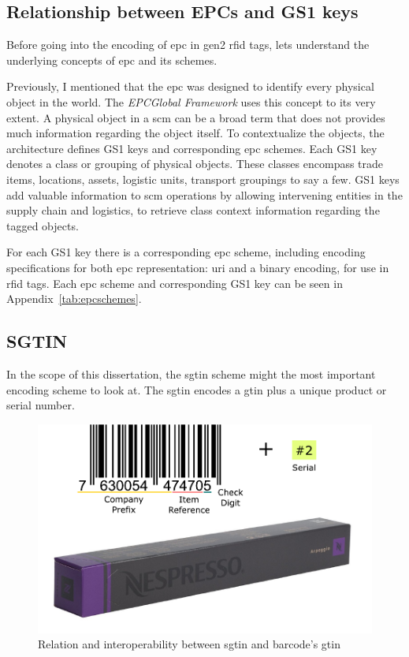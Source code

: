 \subsection{Relationship between EPCs and GS1 keys}

Before going into the encoding of \ac{epc} in \ac{gen2} \ac{rfid} tags, lets understand the underlying concepts of \ac{epc} and its schemes.

Previously, I mentioned that the \ac{epc} was designed to identify every physical object in the world.
The \emph{EPCGlobal Framework} uses this concept to its very extent.
A physical object in a \ac{scm} can be a broad term that does not provides much information regarding the object itself.
To contextualize the objects, the architecture defines GS1 keys and corresponding \ac{epc} schemes.
Each GS1 key denotes a class or grouping of physical objects. These classes encompass trade items, locations, assets, logistic units, transport groupings to say a few.
GS1 keys add valuable information to \ac{scm} operations by allowing intervening entities in the supply chain and logistics, to retrieve class context information regarding the tagged objects.

For each GS1 key there is a corresponding \ac{epc} scheme, including encoding specifications for both \ac{epc} representation: \ac{uri} and a binary encoding, for use in \ac{rfid} tags.
Each \ac{epc} scheme and corresponding GS1 key can be seen in Appendix~\ref{tab:epcschemes}.

\subsection{SGTIN}

In the scope of this dissertation, the \ac{sgtin} scheme might the most important encoding scheme to look at.
The \ac{sgtin} encodes a \ac{gtin} plus a unique product or serial number.

\begin{figure}[!ht]
    \centering
    \includegraphics[width=\textwidth]{./figs/02-state-of-the-art/SGTIN_UPC_Compare.pdf}
    \caption[Relation and interoperability between \ac{sgtin} and barcode's \ac{gtin}]{Relation and interoperability between \ac{sgtin} and barcode's \ac{gtin}~\cite{SGTININFO}} 
    \label{fig:barcodesgtin}
\end{figure}

